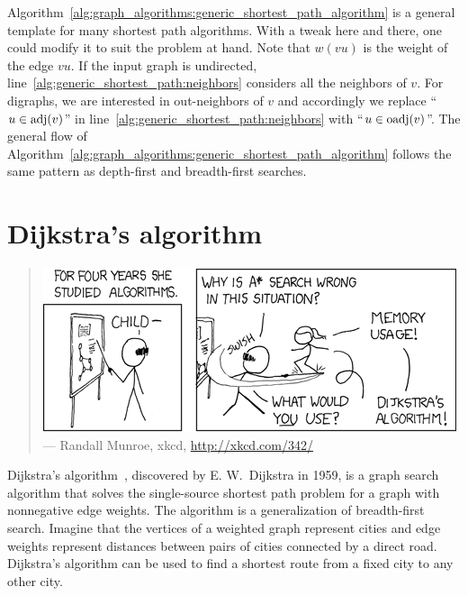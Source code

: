 Algorithm~\ref{alg:graph_algorithms:generic_shortest_path_algorithm}
is a general template for many shortest path
algorithms. With a tweak here and there, one could modify it to suit
the problem at hand. Note that $w(vu)$ is the weight of the edge
$vu$. If the input graph is undirected,
line~\ref{alg:generic_shortest_path:neighbors} considers all the
neighbors of $v$. For digraphs, we are interested in
out-neighbors of $v$ and accordingly we replace
``$u \in \operatorname*{adj}(v)$'' in line~\ref{alg:generic_shortest_path:neighbors}
with ``$u \in \operatorname*{oadj}(v)$''. The general flow of
Algorithm~\ref{alg:graph_algorithms:generic_shortest_path_algorithm}
follows the same pattern as depth-first and
breadth-first searches.



\section{Dijkstra's algorithm}
\label{sec:graph_algorithms:Dijkstra_algorithm}

\begin{quote}
\footnotesize
{}
\includegraphics[scale=0.7]{image/graph-algorithms/dijkstra} \\
\noindent
--- Randall Munroe, xkcd,
\url{http://xkcd.com/342/}
\end{quote}

\noindent
Dijkstra's algorithm~\cite{Dijkstra1959}, discovered by
E. W.~Dijkstra in 1959, is a graph search
algorithm that solves the single-source shortest
path problem for a graph with
nonnegative edge weights. The algorithm is a
generalization of breadth-first
search. Imagine that the vertices of a weighted graph represent cities
and edge weights represent distances between pairs of
cities connected by a direct road. Dijkstra's
algorithm can be used to find a shortest
route from a fixed city to any other city.


